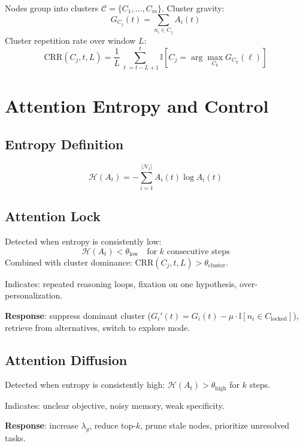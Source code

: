 \documentclass{article}
\newcommand{\nodes}{\mathcal{N}}
\newcommand{\entropy}{\mathcal{H}}
\begin{document}
Nodes group into clusters $\mathcal{C} = \{C_1, \ldots, C_m\}$. Cluster gravity:
\[
G_{C_j}(t) = \sum_{n_i \in C_j} A_i(t)
\]
Cluster repetition rate over window $L$:
\[
\text{CRR}(C_j, t, L) = \frac{1}{L} \sum_{\ell=t-L+1}^{t} \mathbb{I}[C_j = \arg\max_{C_k} G_{C_k}(\ell)]
\]

\section{Attention Entropy and Control}

\subsection{Entropy Definition}

\begin{equation}
\entropy(A_t) = -\sum_{i=1}^{|\nodes_t|} A_i(t) \log A_i(t)
\end{equation}

\subsection{Attention Lock}

Detected when entropy is consistently low:
\[
\entropy(A_t) < \theta_{\text{low}} \quad \text{for } k \text{ consecutive steps}
\]
Combined with cluster dominance: $\text{CRR}(C_j, t, L) > \theta_{\text{cluster}}$.

Indicates: repeated reasoning loops, fixation on one hypothesis, over-personalization.

\textbf{Response}: suppress dominant cluster ($G_i'(t) = G_i(t) - \mu \cdot \mathbb{I}[n_i \in C_{\text{locked}}]$), retrieve from alternatives, switch to explore mode.

\subsection{Attention Diffusion}

Detected when entropy is consistently high: $\entropy(A_t) > \theta_{\text{high}}$ for $k$ steps.

Indicates: unclear objective, noisy memory, weak specificity.

\textbf{Response}: increase $\lambda_g$, reduce top-$k$, prune stale nodes, prioritize unresolved tasks.
\end{document}
